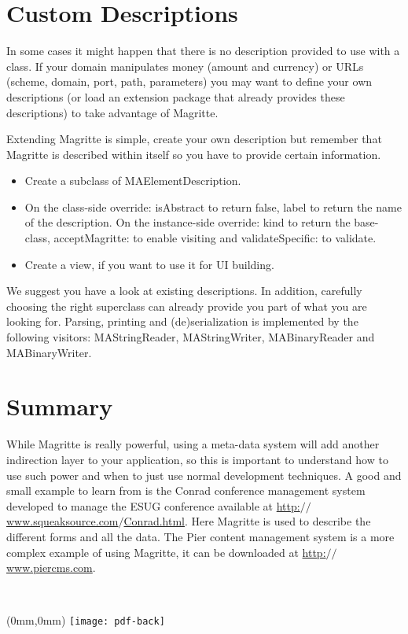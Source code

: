 \documentclass[a4paper,10pt,twoside]{book}
\newcommand{\ct}[1]{{\small\ttfamily\textup{#1}}}
\begin{document}
\section{Custom Descriptions}
\label{book:advanced:magritte:customdescriptions}

In some cases it might happen that there is no description provided to use with a  class. If your domain manipulates money (amount and currency) or URLs (scheme, domain, port, path, parameters) you may want to define your own descriptions (or load an extension package that already provides these descriptions) to take advantage of Magritte. 

Extending Magritte is simple, create your own description but remember that Magritte is described within itself so you have to provide certain information.
 

\begin{itemize}
\item  Create a subclass of \ct{MAElementDescription}.
\item  On the class-side override: \ct{isAbstract} to return false, \ct{label} to return the name of the description. On the instance-side override: \ct{kind} to return the base-class,  \ct{acceptMagritte:} to enable visiting and \ct{validateSpecific:} to validate.
\item  Create a view, if you want to use it for UI building. 
\end{itemize}
 
We suggest you have a look at existing descriptions. In addition, carefully choosing the right superclass can already provide you part of what you are looking for. Parsing, printing and (de)serialization is implemented by the following visitors: \ct{MAStringReader}, \ct{MAStringWriter}, \ct{MABinaryReader} and \ct{MABinaryWriter}.

\section{Summary}
\label{book:advanced:magritte:summary}

While Magritte is really powerful, using a meta-data system will add another indirection layer to your application, so this is important to understand how to use such power and when to just use normal development techniques. A good and small example to learn from is the Conrad conference management system developed to manage the ESUG conference available at \href{http://www.squeaksource.com/Conrad.html}{http:$/$$/$www.squeaksource.com$/$Conrad.html}. Here Magritte is used to describe the different forms and all the data. The Pier content management system is a more complex example of using Magritte, it can be downloaded at \href{http://www.piercms.com}{http:$/$$/$www.piercms.com}.


\backmatter
{\small\raggedright\printindex}

\pagestyle{empty}
~\cleardoublepage
~\cleardoublepage
~\cleardoublepage

\begin{textblock*}{\paperwidth}(0mm,0mm)
   \texttt{[image: pdf-back]}
\end{textblock*}
\newpage
\end{document}

